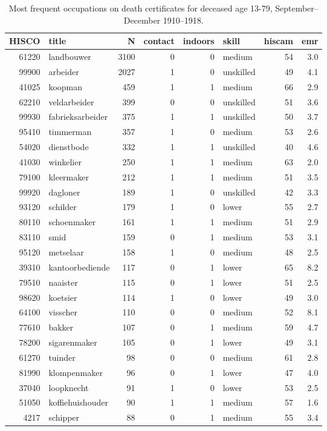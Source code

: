 \begin{table}

\caption{\label{tab:tab:topoccs_selected}Most frequent occupations on death certificates for deceased age 13-79, September--December 1910--1918.}
\centering
\begin{tabular}[t]{r|l|r|r|r|l|r|r}
\hline
HISCO & title & N & contact & indoors & skill & hiscam & emr\\
\hline
61220 & landbouwer & 3100 & 0 & 0 & medium & 54 & 3.0\\
\hline
99900 & arbeider & 2027 & 1 & 0 & unskilled & 49 & 4.1\\
\hline
41025 & koopman & 459 & 1 & 1 & medium & 66 & 2.9\\
\hline
62210 & veldarbeider & 399 & 0 & 0 & unskilled & 51 & 3.6\\
\hline
99930 & fabrieksarbeider & 375 & 1 & 1 & unskilled & 50 & 3.7\\
\hline
95410 & timmerman & 357 & 1 & 0 & medium & 53 & 2.6\\
\hline
54020 & dienstbode & 332 & 1 & 1 & unskilled & 40 & 4.6\\
\hline
41030 & winkelier & 250 & 1 & 1 & medium & 63 & 2.0\\
\hline
79100 & kleermaker & 212 & 1 & 1 & medium & 51 & 3.5\\
\hline
99920 & dagloner & 189 & 1 & 0 & unskilled & 42 & 3.3\\
\hline
93120 & schilder & 179 & 1 & 0 & lower & 55 & 2.7\\
\hline
80110 & schoenmaker & 161 & 1 & 1 & medium & 51 & 2.9\\
\hline
83110 & smid & 159 & 0 & 1 & medium & 53 & 3.1\\
\hline
95120 & metselaar & 158 & 1 & 0 & medium & 48 & 2.5\\
\hline
39310 & kantoorbediende & 117 & 0 & 1 & lower & 65 & 8.2\\
\hline
79510 & naaister & 115 & 0 & 1 & lower & 51 & 2.5\\
\hline
98620 & koetsier & 114 & 1 & 0 & lower & 49 & 3.0\\
\hline
64100 & visscher & 110 & 0 & 0 & medium & 52 & 8.1\\
\hline
77610 & bakker & 107 & 0 & 1 & medium & 59 & 4.7\\
\hline
78200 & sigarenmaker & 105 & 0 & 1 & lower & 49 & 3.1\\
\hline
61270 & tuinder & 98 & 0 & 0 & medium & 61 & 2.8\\
\hline
81990 & klompenmaker & 96 & 0 & 1 & lower & 47 & 4.0\\
\hline
37040 & loopknecht & 91 & 1 & 0 & lower & 53 & 2.5\\
\hline
51050 & koffiehuishouder & 90 & 1 & 1 & medium & 57 & 1.6\\
\hline
4217 & schipper & 88 & 0 & 1 & medium & 55 & 3.4\\
\hline
\end{tabular}
\end{table}
